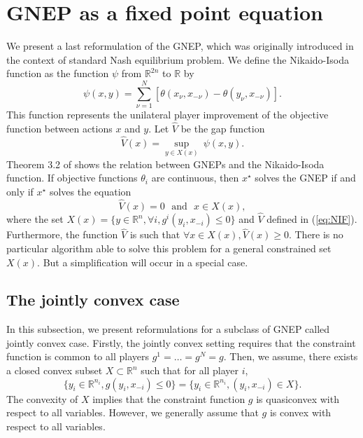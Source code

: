 \documentclass[11pt, a4paper]{article}
\newcommand{\txtm}[1]{\textrm{~~#1~~}}
\newcommand{\R}{\ensuremath{\mathbb{R}}}
\begin{document}
\section{GNEP as a fixed point equation}

We present a last reformulation of the GNEP, which was originally introduced in the context of standard Nash equilibrium problem. 
We define the Nikaido-Isoda function as the function $\psi$ from $\R^{2n}$ to  $\R$ by
\begin{equation}
\psi(x, y) = \sum_{\nu = 1}^N [ \theta(x_\nu, x_{-\nu}) -  \theta(y_\nu, x_{-\nu}) ].
\label{eq:NIF}
\end{equation}
This function represents the unilateral player  improvement of the objective function between actions $x$ and $y$. 
Let $\hat V$ be the gap function 
$$
\hat V(x) = \underset{ y \in X(x) }{\sup}~ \psi(x,y).
$$
Theorem 3.2 of \cite{facchkanz09b} shows the relation between GNEPs and the Nikaido-Isoda function. 
If objective functions $\theta_i$ are continuous, then  $x^\star$ solves the GNEP if and only if $x^\star$ solves the equation 
\begin{equation}
\hat V(x) = 0
\txtm{and} 
x \in X(x),
\label{eq:NIF:general}
\end{equation}
where the set $X(x) = \{y \in \R^n, \forall i, g^i(y_i, x_{-i}) \leq 0 \}$ and $\hat V$ defined in (\ref{eq:NIF}). Furthermore, the function $\hat V$ is such that $\forall x \in X(x), \hat V(x) \geq 0$.
There is no particular algorithm able to solve this problem for a general constrained set $X(x)$. But a simplification will occur in a special case.



\subsection{The jointly convex case}

In this subsection, we present reformulations for a subclass of GNEP called jointly convex case. 
Firstly, the jointly convex setting requires that the constraint function is common to all players $g^1=\dots =g^N= g$.
Then, we assume, there exists a closed convex subset $X \subset \R^n$ such that for all player $i$, 
$$
\{y_i \in \R^{n_i},  g(y_i, x_{-i}) \leq 0 \} 
=
\{y_i \in \R^{n_i},  (y_i, x_{-i}) \in X \} .  
$$ 
The convexity of $X$ implies that the constraint function $g$ is  quasiconvex with respect to all variables.
However, we generally assume that $g$ is convex with respect to all variables.
\end{document}
